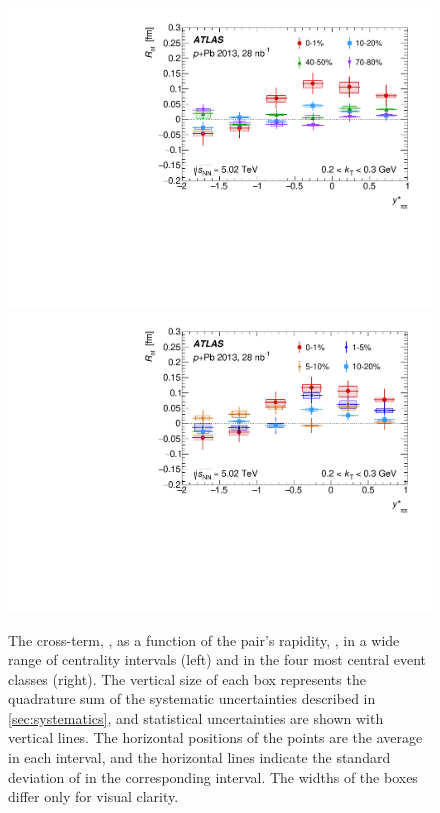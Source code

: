 \begin{figure}[t]
\centering
\includegraphics[width=0.49\linewidth]{canqosl_Rol_kt1_vs_kys.pdf}
\includegraphics[width=0.49\linewidth]{canqosl_Rol_kt1_vs_kys_altcent.pdf}
\caption{The cross-term, \Rol, as a function of the pair's rapidity, \kys, in a wide range of centrality intervals (left) and in the four most central event classes (right). The vertical size of each box represents the quadrature sum of the systematic uncertainties described in \cref{sec:systematics}, and statistical uncertainties are shown with vertical lines. The horizontal positions of the points are the average \kys in each interval, and the horizontal lines indicate the standard deviation of \kys in the corresponding interval. The widths of the boxes differ only for visual clarity.}
\label{fig:results_Rol_kys}
\end{figure}

